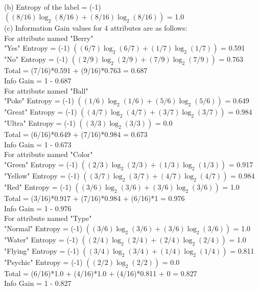 \documentclass{article}
\begin{document}
\\[10pt]
(b) Entropy of the label = (-1) $((8/16) \log_{2} (8/16) + (8/16) \log_{2} (8/16))$  = 1.0
\\[10pt]
(c) Information Gain values for 4 attributes are as follows:
\\[10pt]
For attribute named "Berry"
\\
"Yes"
Entropy = (-1) $((6/7) \log_{2} (6/7) + (1/7) \log_{2} (1/7))$ = 0.591
\\
"No"
Entropy = (-1) $((2/9) \log_{2} (2/9) + (7/9) \log_{2} (7/9))$ = 0.763
\\
Total = (7/16)*0.591 + (9/16)*0.763 = 0.687
\\
Info Gain = 1 - 0.687
\\[10pt]
For attribute named "Ball"
\\
"Poke"
Entropy = (-1) $((1/6) \log_{2} (1/6) + (5/6) \log_{2} (5/6))$ = 0.649
\\
"Great"
Entropy = (-1) $((4/7) \log_{2} (4/7) + (3/7) \log_{2} (3/7))$ = 0.984
\\
"Ultra"
Entropy = (-1) $((3/3) \log_{2} (3/3))$ = 0.0
\\
Total = (6/16)*0.649 + (7/16)*0.984 = 0.673
\\
Info Gain = 1 - 0.673
\\[10pt]
For attribute named "Color"
\\
"Green"
Entropy = (-1) $((2/3) \log_{2} (2/3) + (1/3) \log_{2} (1/3))$ = 0.917
\\
"Yellow"
Entropy = (-1) $((3/7) \log_{2} (3/7) + (4/7) \log_{2} (4/7))$ = 0.984
\\
"Red"
Entropy = (-1) $((3/6) \log_{2} (3/6) + (3/6) \log_{2} (3/6))$ = 1.0
\\
Total = (3/16)*0.917 + (7/16)*0.984  + (6/16)*1 = 0.976
\\
Info Gain = 1 - 0.976
\\[10pt]
For attribute named "Type"
\\
"Normal"
Entropy = (-1) $((3/6) \log_{2} (3/6) + (3/6) \log_{2} (3/6))$ = 1.0
\\
"Water"
Entropy = (-1) $((2/4) \log_{2} (2/4) + (2/4) \log_{2} (2/4))$ = 1.0
\\
"Flying"
Entropy = (-1) $((3/4) \log_{2} (3/4) + (1/4) \log_{2} (1/4))$ = 0.811
\\
"Psychic"
Entropy = (-1) $((2/2) \log_{2} (2/2))$ = 0.0
\\
Total = (6/16)*1.0 + (4/16)*1.0  + (4/16)*0.811 + 0 = 0.827
\\
Info Gain = 1 - 0.827
\\[10pt]
\end{document}
